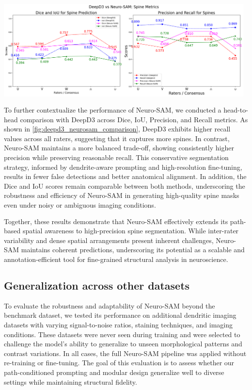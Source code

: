 \begin{center}
\includegraphics[width=0.98\textwidth]{figures/44_deepd3_neurosam_comparison.png}
\label{fig:deepd3_neurosam_comparison}
\end{center}

To further contextualize the performance of Neuro-\gls{SAM}, we conducted a head-to-head comparison with \gls{DeepD3} across Dice, \gls{IoU}, Precision, and Recall metrics. As shown in \autoref{fig:deepd3_neurosam_comparison}, \gls{DeepD3} exhibits higher recall values across all raters, suggesting that it captures more spines. In contrast, Neuro-\gls{SAM} maintains a more balanced trade-off, showing consistently higher precision while preserving reasonable recall. This conservative segmentation strategy, informed by dendrite-aware prompting and high-resolution fine-tuning, results in fewer false detections and better anatomical alignment. In addition, the Dice and \gls{IoU} scores remain comparable between both methods, underscoring the robustness and efficiency of Neuro-\gls{SAM} in generating high-quality spine masks even under noisy or ambiguous imaging conditions.

Together, these results demonstrate that Neuro-\gls{SAM} effectively extends its path-based spatial awareness to high-precision spine segmentation. While inter-rater variability and dense spatial arrangements present inherent challenges, Neuro-\gls{SAM} maintains coherent predictions, underscoring its potential as a scalable and annotation-efficient tool for fine-grained structural analysis in neuroscience.

\subsection{Generalization across other datasets}
To evaluate the robustness and adaptability of Neuro-\gls{SAM} beyond the benchmark dataset, we tested its performance on additional dendritic imaging datasets with varying signal-to-noise ratios, staining techniques, and imaging conditions. These datasets were never seen during training and were selected to challenge the model’s ability to generalize to unseen morphological patterns and contrast variations. In all cases, the full Neuro-\gls{SAM} pipeline was applied without re-training or fine-tuning. The goal of this evaluation is to assess whether our path-conditioned prompting and modular design generalize well to diverse settings while maintaining structural fidelity.


